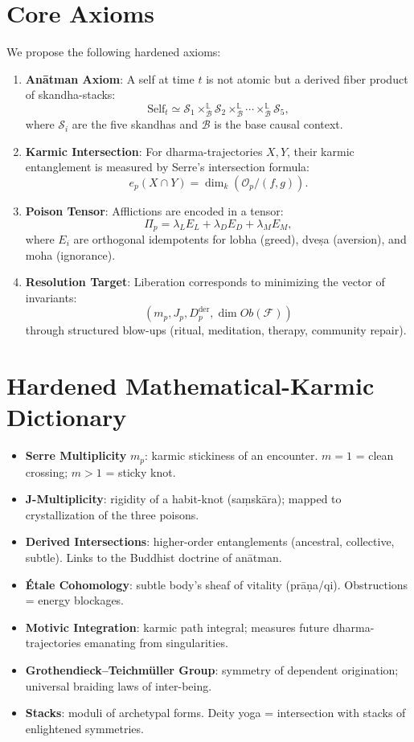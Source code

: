 \documentclass[12pt]{article}
\begin{document}
\section{Core Axioms}
We propose the following hardened axioms:

\begin{enumerate}
  \item \textbf{Anātman Axiom}: A self at time $t$ is not atomic but a derived fiber product of skandha-stacks:
  \[
  \text{Self}_t \simeq \mathcal{S}_1 \times^{\mathbb{L}}_{\mathcal{B}} \mathcal{S}_2 \times^{\mathbb{L}}_{\mathcal{B}} \cdots \times^{\mathbb{L}}_{\mathcal{B}} \mathcal{S}_5,
  \]
  where $\mathcal{S}_i$ are the five skandhas and $\mathcal{B}$ is the base causal context.

  \item \textbf{Karmic Intersection}: For dharma-trajectories $X,Y$, their karmic entanglement is measured by Serre's intersection formula:
  \[
  e_p(X\cap Y) = \dim_k(\mathcal{O}_p/(f,g)).
  \]

  \item \textbf{Poison Tensor}: Afflictions are encoded in a tensor:
  \[
  \Pi_p = \lambda_{L}E_L + \lambda_{D}E_D + \lambda_{M}E_M,
  \]
  where $E_i$ are orthogonal idempotents for lobha (greed), dveṣa (aversion), and moha (ignorance).

  \item \textbf{Resolution Target}: Liberation corresponds to minimizing the vector of invariants:
  \[
  (m_p, J_p, D^{\mathrm{der}}_p, \dim Ob(\mathcal{F}))
  \]
  through structured blow-ups (ritual, meditation, therapy, community repair).
\end{enumerate}

\section{Hardened Mathematical-Karmic Dictionary}
\begin{itemize}
  \item \textbf{Serre Multiplicity} $m_p$: karmic stickiness of an encounter. $m=1$ = clean crossing; $m>1$ = sticky knot.
  \item \textbf{J-Multiplicity}: rigidity of a habit-knot (saṃskāra); mapped to crystallization of the three poisons.
  \item \textbf{Derived Intersections}: higher-order entanglements (ancestral, collective, subtle). Links to the Buddhist doctrine of anātman.
  \item \textbf{Étale Cohomology}: subtle body’s sheaf of vitality (prāṇa/qi). Obstructions = energy blockages.
  \item \textbf{Motivic Integration}: karmic path integral; measures future dharma-trajectories emanating from singularities.
  \item \textbf{Grothendieck–Teichmüller Group}: symmetry of dependent origination; universal braiding laws of inter-being.
  \item \textbf{Stacks}: moduli of archetypal forms. Deity yoga = intersection with stacks of enlightened symmetries.
\end{itemize}
\end{document}
